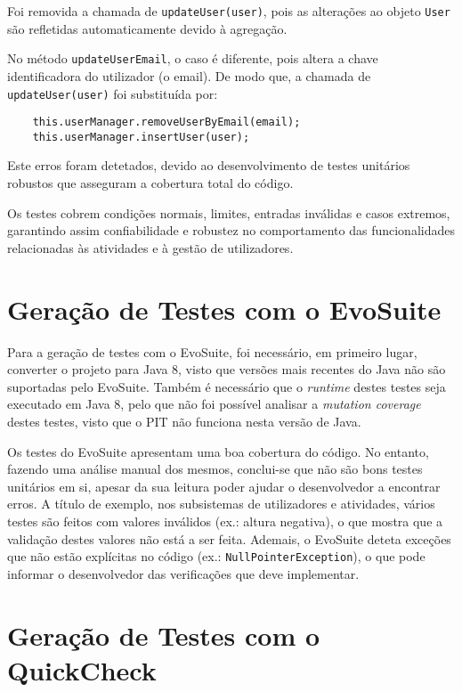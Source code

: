 \documentclass[12pt, a4paper]{article}
\begin{document}
Foi removida a chamada de \texttt{updateUser(user)}, pois as alterações ao objeto \texttt{User} são
refletidas automaticamente devido à agregação.

No método \texttt{updateUserEmail}, o caso é diferente, pois altera a chave identificadora do
utilizador (o email). De modo que, a chamada de \texttt{updateUser(user)} foi substituída por:
\begin{verbatim}
    this.userManager.removeUserByEmail(email);
    this.userManager.insertUser(user);
\end{verbatim}

Este erros foram detetados, devido ao desenvolvimento de testes unitários robustos que asseguram a
cobertura total do código.

Os testes cobrem condições normais, limites, entradas inválidas e casos extremos, garantindo assim
confiabilidade e robustez no comportamento das funcionalidades relacionadas às atividades e à gestão
de utilizadores.

\section{Geração de Testes com o EvoSuite}

Para a geração de testes com o EvoSuite, foi necessário, em primeiro lugar, converter o projeto para
Java 8, visto que versões mais recentes do Java não são suportadas pelo EvoSuite. Também é
necessário que o \emph{runtime} destes testes seja executado em Java 8, pelo que não foi possível
analisar a \emph{mutation coverage} destes testes, visto que o PIT não funciona nesta versão de
Java.

Os testes do EvoSuite apresentam uma boa cobertura do código. No entanto, fazendo uma análise manual
dos mesmos, conclui-se que não são bons testes unitários em si, apesar da sua leitura poder ajudar
o desenvolvedor a encontrar erros. A título de exemplo, nos subsistemas de utilizadores e
atividades, vários testes são feitos com valores inválidos (ex.: altura negativa), o que mostra que
a validação destes valores não está a ser feita. Ademais, o EvoSuite deteta exceções que não estão
explícitas no código (ex.: \texttt{NullPointerException}), o que pode informar o desenvolvedor das
verificações que deve implementar.

\section{Geração de Testes com o QuickCheck}
\end{document}
